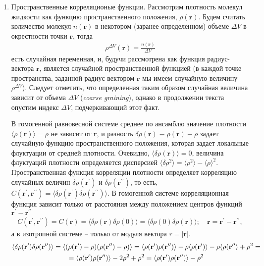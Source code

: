 \documentclass[14pt]{extarticle}
\newcommand{\vr}{\mathbf{r}}
\newcommand{\pr}{\prime}
\begin{document}
\begin{enumerate}
		\item Пространственные корреляционые функции. Рассмотрим плотность молекул жидкости как функцию пространственного положения, $\rho(\vr)$. Будем считать количество молекул $n(\vr)$ в некотором (заранее определенном) объеме $\Delta V$ в окрестности точки $\vr$, тогда
\begin{gather}
	\rho^{\Delta V} (\vr) = \frac{n(\vr)}{\Delta V} \label{1.194}
\end{gather}
есть случайная переменная, и, будучи рассмотрена как функция радиус-вектора $\vr$, является случайной пространственной функцией (в каждой точке пространства, заданной радиус-вектором $\vr$ мы имеем случайную величину $\rho^{\Delta V}$). Следует отметить, что определенная таким образом случайная величина зависит от объема $\Delta V$ (\textit{coarse graining}), однако в продолжении текста опустим индекс $\Delta V$, подчеркивающий этот факт. \par
В гомогенной равновесной системе среднее по ансамблю значение плотности $\langle \rho(\vr) \rangle = \rho$ не зависит от $\vr$, и разность $\delta \rho(\vr) \equiv \rho(\vr) - \rho$ задает случайную функцию пространственного положения, которая задает локальные флуктуации от средней плотности. Очевидно, $\langle \delta \rho(\vr) \rangle = 0$, величина флуктуаций плотности определяется дисперсией $\langle \delta \rho^2 \rangle = \langle \rho^2 \rangle - \langle \rho \rangle^2$. Пространственная функция корреляции плотности определяет корреляцию случайных величин $\delta \rho(\vr^\prime)$ и $\delta \rho (\vr^{\prime\prime})$, то есть, $C(\vr^\prime, \vr^{\prime\prime}) = \langle \delta \rho(\vr^\prime) \delta \rho(\vr^{\prime\prime}) \rangle$. В гомогенной системе корреляционная функция зависит только от расстояния между положением центров функций $\vr^\prime - \vr^{\prime\prime}$
\begin{gather}
		C( \vr^\pr, \vr^{\pr\pr}) = C(\vr) = \langle \delta \rho(\vr) \delta \rho(0) \rangle = \langle \delta \rho(0) \delta \rho(\vr) \rangle; \quad \vr = \vr^\pr - \vr^{\pr\pr}, \label{1.195}
\end{gather}
а в изотропной системе -- только от модуля вектора $r = | \vr |$.
\begin{gather}
		\langle \delta \rho(\vr^\pr) \delta \rho(\vr^{\pr\pr}) \rangle = \langle (\rho(\vr^\pr) - \rho)(\rho(\vr^{\pr\pr}) - \rho) \rangle = \langle \rho(\vr^\pr) \rho(\vr^{\pr\pr}) \rangle - \rho \langle \rho(\vr^\prime) \rangle - \rho \langle \rho(\vr^{\pr\pr} \rangle + \rho^2 = \notag \\ 
	=	\langle \rho(\vr^\pr) \rho(\vr^{\pr\pr}) \rangle - 2\rho^2 + \rho^2 = \langle \rho(\vr^\pr) \rho(\vr^{\pr\pr}) \rangle -  \rho^2
\end{gather}


\end{enumerate}
\end{document}
